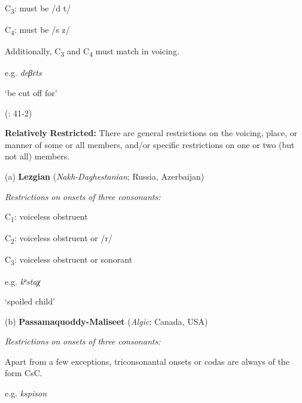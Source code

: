 C\textsubscript{3}: must be /d t/



C\textsubscript{4}: must be /s z/

\z


Additionally, C\textsubscript{3} and C\textsubscript{4} must match in voicing.



e.g.   \textit{deβɾts}



    ‘be cut off for’



(\citealt{WieringWiering1995}: 41-2)



\ea\label{ex:(3.28)}
  \textbf{Relatively} \textbf{Restricted:} There are general restrictions on the voicing, place, or manner of some or all members, and/or specific restrictions on one or two (but not all) members.



(a)   \textbf{Lezgian} (\textit{Nakh-Daghestanian}; Russia, Azerbaijan)



\textit{Restrictions} \textit{on} \textit{onsets} \textit{of} \textit{three} \textit{consonants:}



C\textsubscript{1}: voiceless obstruent



C\textsubscript{2}: voiceless obstruent or /r/



C\textsubscript{3}: voiceless obstruent or sonorant



e.g.  \textit{kʰstaχ}



    ‘spoiled child’



\citep[37]{Haspelmath1993}



(b)   \textbf{Passamaquoddy-Maliseet} (\textit{Algic}; Canada, USA)



\textit{Restrictions} \textit{on} \textit{onsets} \textit{of} \textit{three} \textit{consonants:}



Apart from a few exceptions, triconsonantal onsets or codas are always of the form CsC.



e.g.  \textit{kspison}



